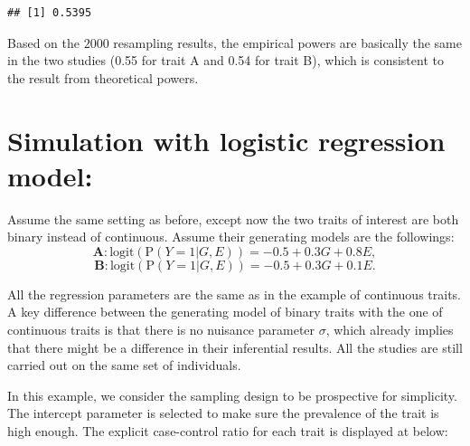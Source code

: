 \documentclass[
]{article}
\begin{document}
\begin{verbatim}
## [1] 0.5395
\end{verbatim}

Based on the \(2000\) resampling results, the empirical powers are
basically the same in the two studies (0.55 for trait A and 0.54 for
trait B), which is consistent to the result from theoretical powers.

\hypertarget{simulation-with-logistic-regression-model}{%
\section{Simulation with logistic regression
model:}\label{simulation-with-logistic-regression-model}}

Assume the same setting as before, except now the two traits of interest
are both binary instead of continuous. Assume their generating models
are the followings:
\[\textbf{A}:\text{logit}(\text{P}(Y=1|G,E)) = -0.5 + 0.3G + 0.8E,\]
\[\textbf{B}: \text{logit}(\text{P}(Y=1|G,E)) = -0.5 + 0.3G + 0.1E.\]

All the regression parameters are the same as in the example of
continuous traits. A key difference between the generating model of
binary traits with the one of continuous traits is that there is no
nuisance parameter \(\sigma\), which already implies that there might be
a difference in their inferential results. All the studies are still
carried out on the same set of individuals.

In this example, we consider the sampling design to be prospective for
simplicity. The intercept parameter is selected to make sure the
prevalence of the trait is high enough. The explicit case-control ratio
for each trait is displayed at below:
\end{document}
